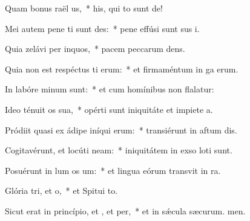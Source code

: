 \item Quam bonus raël us,~* his, qui to sunt de!
\item Mei autem pene ti sunt des:~* pene effúsi sunt sus i.
\item Quia zelávi per inquos,~* pacem peccarum dens.
\item Quia non est respéctus ti erum:~* et firmaméntum in ga erum.
\item In labóre minum  sunt:~* et cum homínibus non flalatur:
\item Ideo ténuit os sua,~* opérti sunt iniquitáte et impiete a.
\item Pródiit quasi ex ádipe iníqui erum:~* transiérunt in aftum dis.
\item Cogitavérunt, et locúti  neam:~* iniquitátem in exso loti sunt.
\item Posuérunt in lum os um:~* et lingua eórum transvit in ra.
\item Glória tri, et o,~* et Spitui to.
\item Sicut erat in princípio, et , et per,~* et in sǽcula sæcurum. men.
